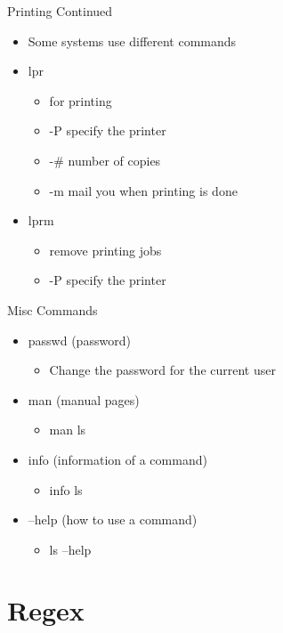 \documentclass{beamer}
\begin{document}
\begin{frame}{Printing Continued}
\begin{itemize}
\item Some systems use different commands
\item lpr
\begin{itemize}
\item for printing
\item -P specify the printer
\item -\# number of copies
\item -m mail you when printing is done
\end{itemize}
\item lprm
\begin{itemize}
\item remove printing jobs
\item -P specify the printer
\end{itemize}
\end{itemize}
\end{frame}

\begin{frame}{Misc Commands}
\begin{itemize}
\item passwd (password)
\begin{itemize}
\item Change the password for the current user
\end{itemize}
\item man (manual pages)
\begin{itemize}
\item man ls
\end{itemize}
\item info (information of a command)
\begin{itemize}
\item info ls
\end{itemize}
\item --help (how to use a command)
\begin{itemize}
\item ls --help
\end{itemize}
\end{itemize}
\end{frame}

\section{Regex}
\subsection{}
\end{document}
